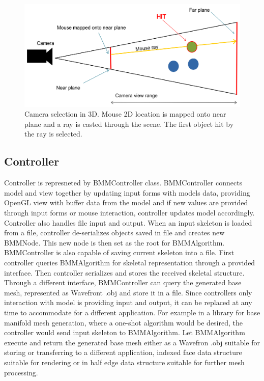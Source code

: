 \begin{figure}[h]
    \centering
    \includegraphics[width=\textwidth]{images/camera_selection}
    \caption[Camera selection]{Camera selection in 3D. Mouse 2D location is mapped onto near plane and a ray is casted through the scene. The first object hit by the ray is selected.}
    \label{fig:camera_selection}
\end{figure}

\subsection{Controller}

Controller is represneted by BMMController class.
BMMController connects model and view together by updating input forms with models data, providing OpenGL view with buffer data from the model and if new values are provided through input forms or mouse interaction, controller updates model accordingly.
Controller also handles file input and output.
When an input skeleton is loaded from a file, controller de-serializes objects saved in file and creates new BMMNode.
This new node is then set as the root for BMMAlgorithm.
BMMController is also capable of saving current skeleton into a file.
First controller queries BMMAlgorithm for skeletal representation through a provided interface.
Then controller serializes and stores the received skeletal structure.
Through a different interface, BMMController can query the generated base mesh, represented as Wavefront .obj and store it in a file.
Since controllers only interaction with model is providing input and output, it can be replaced at any time to accommodate for a different application.
For example in a library for base manifold mesh generation, where a one-shot algorithm would be desired, the controller would  send input skeleton to BMMAlgorithm.
Let BMMAlgorithm execute and return the generated base mesh either as a Wavefron .obj suitable for storing or transferring to a different application, indexed face data structure suitable for rendering or in half edge data structure suitable for further mesh processing.

